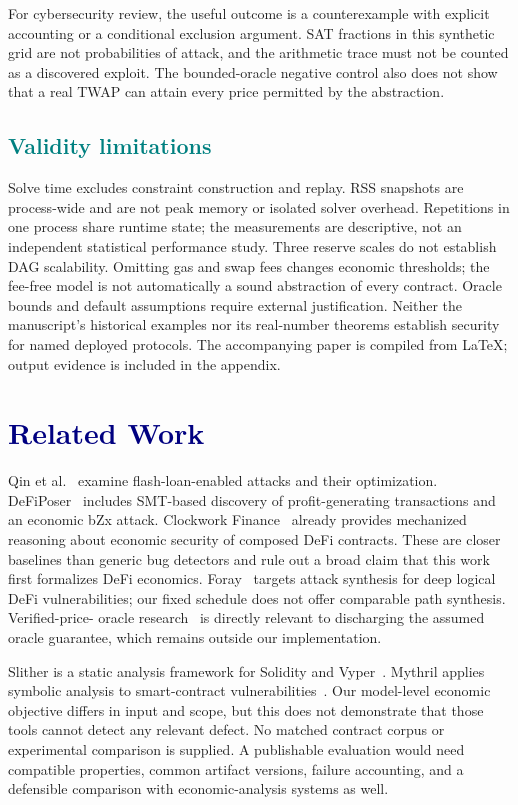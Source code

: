 \documentclass[conference]{IEEEtran}
\begin{document}
For cybersecurity review, the useful outcome is a counterexample with explicit
accounting or a conditional exclusion argument. SAT fractions in this synthetic
grid are not probabilities of attack, and the arithmetic trace must not be
counted as a discovered exploit. The bounded-oracle negative control also does
not show that a real TWAP can attain every price permitted by the abstraction.

\subsection{\textcolor{Teal}{Validity limitations}}
Solve time excludes constraint construction and replay. RSS snapshots are
process-wide and are not peak memory or isolated solver overhead. Repetitions
in one process share runtime state; the measurements are descriptive, not an
independent statistical performance study. Three reserve scales do not establish
DAG scalability. Omitting gas and swap fees changes economic thresholds;
the fee-free model is not automatically a sound abstraction of every contract.
Oracle bounds and default assumptions require external justification. Neither
the manuscript's historical examples nor its real-number theorems establish
security for named deployed protocols. The accompanying paper is compiled from LaTeX; output evidence is included in the appendix.

\section{\textcolor{Navy}{Related Work}}
Qin et al.~\cite{qin} examine flash-loan-enabled attacks and their optimization.
DeFiPoser~\cite{defiposer} includes SMT-based discovery of profit-generating
transactions and an economic bZx attack. Clockwork Finance~\cite{clockwork}
already provides mechanized reasoning about economic security of composed
DeFi contracts. These are closer baselines than generic bug detectors and
rule out a broad claim that this work first formalizes DeFi economics.
Foray~\cite{foray} targets attack synthesis for deep logical DeFi vulnerabilities;
our fixed schedule does not offer comparable path synthesis. Verified-price-
oracle research~\cite{oracle} is directly relevant to discharging the assumed
oracle guarantee, which remains outside our implementation.

Slither is a static analysis framework for Solidity and Vyper~\cite{slither}.
Mythril applies symbolic analysis to smart-contract vulnerabilities~\cite{mythril}.
Our model-level economic objective differs in input and scope, but this does
not demonstrate that those tools cannot detect any relevant defect. No matched
contract corpus or experimental comparison is supplied. A publishable evaluation
would need compatible properties, common artifact versions, failure accounting,
and a defensible comparison with economic-analysis systems as well.
\end{document}
